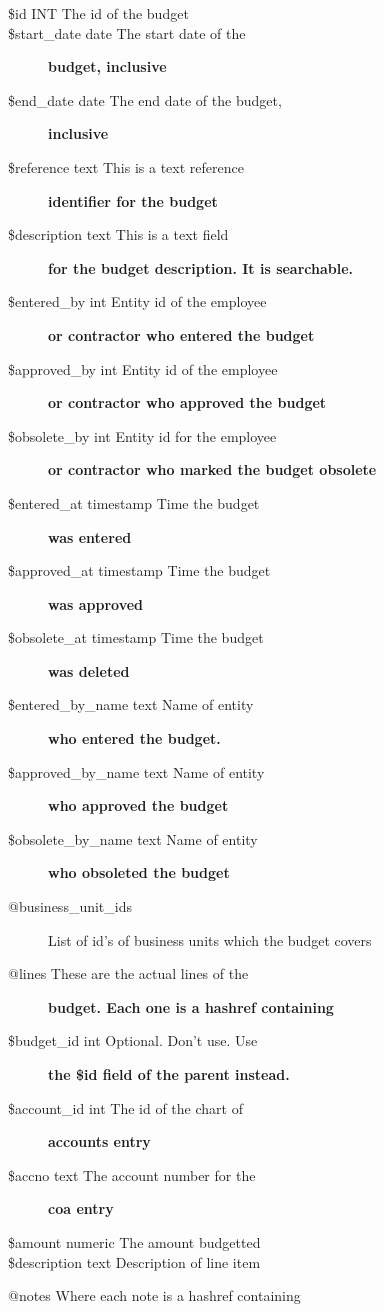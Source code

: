 \begin{description}
\begin{description}
\begin{description}
\begin{description}
\begin{description}
\begin{description}
\begin{description}
\begin{description}
\begin{description}
\begin{description}
\begin{description}
\item[{\$id INT
   The id of the budget}] \mbox{}
\item[{\$start\_date date The start date of the}] \textbf{budget, inclusive}
\item[{\$end\_date date The end date of the budget,}] \textbf{inclusive}
\item[{\$reference text This is a text reference}] \textbf{identifier for the budget}
\item[{\$description text This is a text field}] \textbf{for the budget description. It is searchable.}
\item[{\$entered\_by int Entity id of the employee}] \textbf{or contractor who entered the budget}
\item[{\$approved\_by int Entity id of the employee}] \textbf{or contractor who approved the budget}
\item[{\$obsolete\_by int Entity id for the employee}] \textbf{or contractor who marked the budget obsolete}
\item[{\$entered\_at timestamp Time the budget}] \textbf{was entered}
\item[{\$approved\_at timestamp Time the budget}] \textbf{was approved}
\item[{\$obsolete\_at timestamp Time the budget}] \textbf{was deleted}
\item[{\$entered\_by\_name text Name of entity}] \textbf{who entered the budget.}
\item[{\$approved\_by\_name text Name of entity}] \textbf{who approved the budget}
\item[{\$obsolete\_by\_name text Name of entity}] \textbf{who obsoleted the budget}
\item[{@business\_unit\_ids}] \mbox{}

List of id's of business units which the budget covers


\item[{@lines These are the actual lines of the}] \textbf{budget. Each one is a hashref containing}
\item[{\$budget\_id int Optional. Don't use. Use}] \textbf{the \$id field of the parent instead.}
\item[{\$account\_id int The id of the chart of}] \textbf{accounts entry}
\item[{\$accno text The account number for the}] \textbf{coa entry}
\item[{\$amount numeric The amount budgetted}] \mbox{}
\item[{\$description text Description of line item}] \mbox{}\end{description}
@notes
Where each note is a hashref containing


\end{description}
\end{description}
\end{description}
\end{description}
\end{description}
\end{description}
\end{description}
\end{description}
\end{description}
\end{description}
